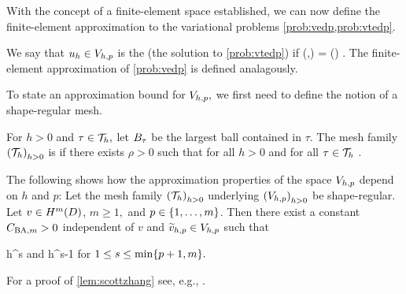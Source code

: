 

    With the concept of a finite-element space established, we can now define the finite-element approximation to the variational problems \cref{prob:vedp,prob:vtedp}.

    \label{prob:fevtedp}
    We say that $u_{h} \in V_{h,p}$ is the  (the solution to \cref{prob:vtedp}) if
    \beq\label{eq:fevtedp}
    \aT(\uh,\vh) = \LT(\vh) \tforall \vh \in \Vhp.
    \eeq
    The finite-element approximation of \cref{prob:vedp} is defined analagously.
    \eprob

    To state an approximation bound for $V_{h,p},$ we first need to define the notion of a shape-regular mesh.

    For $h>0$ and $\tau \in \mathcal T_{h},$ let $B_{\tau}$ be the largest ball contained in $\tau.$ The mesh family $\mleft(\Th\mright)_{h>0}$ is  if there exists $\rho > 0$ such that for all $h>0$ and for all $\tau \in \mathcal T_{h}$
    \beqs
\diam \Btau \geq \rho \diam \tau.
    \eeqs
    \ede

    The following  shows how the approximation properties of the space $V_{h,p}$ depend on $h$ and $p$:
    \label{lem:scottzhang}
    Let the mesh family $\mleft(\Th\mright)_{h>0}$ underlying $\mleft(\Vhp\mright)_{h>0}$ be shape-regular. Let $v \in \HmD$, $m \geq 1,$ and $p \in \set{1,\ldots,m}$. Then there exist a constant $C_{\mathrm{BA},m}>0$ independent of $v$ and $\widetilde{v}_{h,p} \in V_{h,p}$ such that

    \beqs
{} \leq \CSZm h^s 
    \eeqs
     and
    \beqs
{} \leq \CSZm h^{s-1} 
\eeqs
for $1 \leq s \leq \min\set{p+1,m}.$
    \ele

    For a proof of \cref{lem:scottzhang} see, e.g., \cite[Theorems 4.4.4 and 4.4.20 and Remark 4.4.26]{BrSc:08}.

